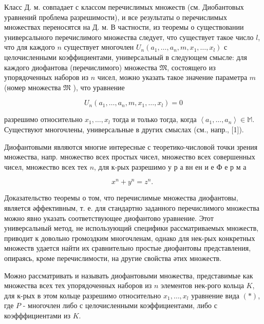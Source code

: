 \documentclass[10pt]{article}
\begin{document}
Класс Д. м. совпадает с классом перечислимых множеств (см. Диобантовых уравнений проблема разрешимости), и все результаты о перечислимых множествах переносятся на Д. м. В частности, из теоремы о существовании универсального перечислимого множества следует, что существует такое число $l$, что для каждого $n$ существует многочлен $U_{n}\left(a_{1}, \ldots, a_{n}, m, x_{1}, \ldots, x_{l}\right)$ с целочисленными коэффициентами, универсальный в следующем смысле: для каждого диофантова (перечислимого) множества $\mathfrak{M}$, состоящего из упорядоченных наборов из $n$ чисел, можно указать такое значение параметра $m$ (номер множества $\mathfrak{M}$ ), что уравнение



\[

U_{n}\left(a_{1}, \ldots, a_{n}, m, x_{1}, \ldots, x_{l}\right)=0

\]



разрешимо относительно $x_{1}, \ldots, x_{l}$ тогда и только тогда, когда $\left\langle a_{1}, \ldots, a_{n}\right\rangle \in \mathbb{M}$. Существуют многочлены, универсальные в других смыслах (см., напр., [1]).



Диофантовыми являются многие интересные с теоретико-числовой точки зрения множества, напр. множество всех простых чисел, множество всех совершенных чисел, множество всех тех $n$, для к-рых разрешимо у р а вн ен и е Ф е р м а



\[

x^{n}+y^{n}=z^{n} \text {. }

\]



Доказательство теоремы о том, что перечислимые множества диофантовы, является әффективным, т. е. для стандартно заданного перечислимого множества можно явно указать соответствующее диофантово уравнение. Этот универсальный метод, не использующий специфики рассматриваемых множеств, приводит к довольно громоздким многочленам, однако для нек-рых конкретных множеств удается найти их сравнительно простые диофантовы представления, опираясь, кроме перечислимости, на другие свойства әтих множеств.



Можно рассматривать и называть диофантовыми множества, представимые как множества всех тех упорядоченных наборов из $n$ элементов нек-рого кольца $K$, для к-рых в этом кольце разрешимо относительно $x_{1}, \ldots, x_{l}$ уравнение вида $(*)$, где $P$ - многочлен либо с целочисленными коэффициентами, либо с коэфффициентами из $K$.
\end{document}
